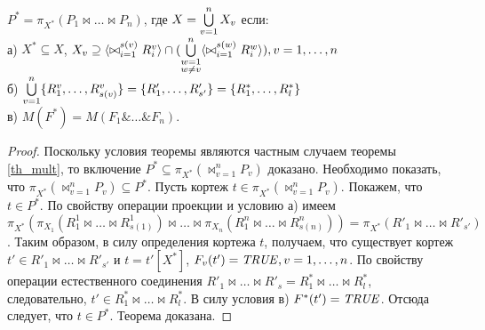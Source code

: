 \author{Мосин Сергей, Зыкин Сергей}
\begin{theorem}
$P^{\ast} = \pi_{X^{\ast}} (P_1 \bowtie \dots \bowtie 
P_n)$, где $X = \bigcup\limits_{v=1}^{n} X_{v}$ если:
\\а) $X^{\ast} \subseteq X$, $X_v \supseteq \<\bowtie_{i=1}^{s(v)} R^v_i> \cap (\bigcup\limits_{\substack{w=1\\ w \neq v}}^{n} \<\bowtie_{i=1}^{s(w)} R^w_i> ), v = 1,\dots,n$
\\б)
$ \bigcup\limits_{v=1}^{n} \{R^{v}_{1}, \ldots, R^{v}_{s(v)}\} = \{R'_{1}, \ldots, R'_{s'}\}
= \{R^{\ast}_{1}, \ldots, R^{\ast}_{l}\} $
\\в) $M(F^{\ast}) = M(F_{1} \& \dots \& F_{n})$.
\label{th_mult_eq}
\end{theorem} 
\begin{proof}

Поскольку условия теоремы являются частным случаем теоремы \ref{th_mult}, то
включение $P^{\ast} \subseteq \pi_{X^{\ast}} (\bowtie_{v=1}^{n} P_{v})$
доказано. Необходимо показать, что
$\pi_{X^{\ast}} (\bowtie_{v=1}^{n} P_{v}) \subseteq P^{\ast}$. Пусть
кортеж $t \in \pi_{X^{\ast}} (\bowtie_{v=1}^{n} P_{v})$. Покажем, что
$t \in P^{\ast}$. По свойству операции проекции и условию а) имеем
$\pi_{X^{\ast}}(\pi_{X_1}(R^1_1 \bowtie \dots \bowtie R^1_{s(1)}) \bowtie \dots
\bowtie \pi_{X_n}(R^n_1 \bowtie \dots \bowtie R^n_{s(n)})) = \pi_{X^{\ast}}
(R'_1 \bowtie \dots \bowtie R'_{s'})$. Таким образом, в силу определения кортежа
$t$, получаем, что существует кортеж  $t' \in R'_1 \bowtie \ldots \bowtie
R'_{s'}$ и $t = t'[X^{\ast}]$, $F_v(t')=\mathit{TRUE}, v = 1,\dots,n$. По свойству
операции естественного соединения $R'_1 \bowtie \ldots \bowtie R'_s = R^{\ast}_1
\bowtie \ldots \bowtie R^{\ast}_l$, следовательно, $t' \in R^{\ast}_1 \bowtie
\ldots \bowtie R^{\ast}_l$. В силу условия в) $F^{\ast} (t')=\mathit{TRUE}$. Отсюда следует, что $t \in P^{\ast}$.
Теорема доказана.
\end{proof} 

